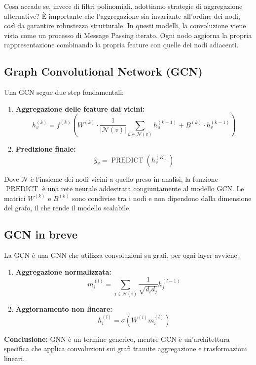 Cosa accade se, invece di filtri polinomiali, adottiamo strategie di aggregazione alternative? È importante che l’aggregazione sia invariante all’ordine dei nodi, così da garantire robustezza strutturale. In questi modelli, la convoluzione viene vista come un processo di Message Passing iterato. Ogni nodo aggiorna la propria rappresentazione combinando la propria feature con quelle dei nodi adiacenti.

\subsection{Graph Convolutional Network (GCN)}

Una GCN segue due step fondamentali:
\begin{enumerate}
    \item \textbf{Aggregazione delle feature dai vicini:}
    \[
        h_v^{(k)} = f^{(k)}\left(W^{(k)} \cdot \frac{1}{|\mathcal{N}(v)|} \sum_{u \in \mathcal{N}(v)} h_u^{(k-1)} + B^{(k)} \cdot h_v^{(k-1)}\right)
    \]
    \item \textbf{Predizione finale:}
    \[
        \hat y_v = \operatorname{PREDICT}(h_v^{(K)})
    \]
\end{enumerate}
Dove $\mathcal{N}$ è l'insieme dei nodi vicini a quello preso in analisi, la funzione \( \operatorname{PREDICT} \) è una rete neurale addestrata congiuntamente al modello GCN. Le matrici \( W^{(k)} \) e \( B^{(k)} \) sono condivise tra i nodi e non dipendono dalla dimensione del grafo, il che rende il modello scalabile.

\subsection{GCN in breve}

La GCN è una GNN che utilizza convoluzioni su grafi, per ogni layer avviene:
\begin{enumerate}
    \item \textbf{Aggregazione normalizzata:}
    \[
        m_i^{(l)} = \sum_{j\in \mathcal{N}(i)} \frac{1}{\sqrt{d_i d_j}} h_j^{(l-1)}
    \]
    \item \textbf{Aggiornamento non lineare:}
    \[
        h_i^{(l)} = \sigma(W^{(l)} m_i^{(l)})
    \]
\end{enumerate}

\textbf{Conclusione:} GNN è un termine generico, mentre GCN è un’architettura specifica che applica convoluzioni sui grafi tramite aggregazione e trasformazioni lineari.

